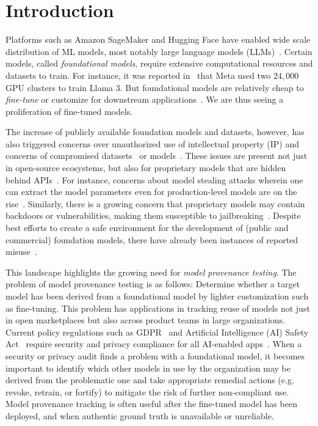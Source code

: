 \section{Introduction}
\label{sec:introduction}

%
Platforms such as Amazon SageMaker and Hugging Face have enabled wide scale distribution of ML models, most notably large language models (LLMs)~\cite{roziere2023code,wu2024pmc-huggingface,Intelligence2024}. 
%
Certain models, called {\em foundational models}, require extensive computational resources and datasets to train. For instance, it was reported in~\cite{meta-cluster} that Meta used two $24,000$ GPU clusters to train Llama 3. But foundational models are relatively cheap to {\em fine-tune} or customize for downstream applications~\cite{kenton2019bert,wu2021newsbert}. We are thus seeing a proliferation of fine-tuned models.

The increase of publicly available foundation models and datasets, however, has also triggered concerns over unauthorized use of intellectual property (IP) and concerns of compromised datasets~\cite{carlini2024poisoning} or models~\cite{hubinger2024sleeper}.
%
These issues are present not just in open-source ecosystems, but also for proprietary models that are hidden behind APIs~\cite{anil2023palm,chatgpt-api}. For instance, concerns about model stealing attacks wherein one can extract the model parameters even for production-level models are on the rise~\cite{carlini2024stealing,tramer2016stealing,orekondy2019knockoff}.
%
Similarly, there is a growing concern that proprietary models may contain backdoors or vulnerabilities, making them susceptible to jailbreaking~\cite{hubinger2024sleeper,anil2024many,zou2023universal}. 
Despite best efforts to create a safe environment for the development of (public and commercial) foundation models, there have already been instances of reported misuse~\cite{china2024llm,payload-malicious,childabuse-diffusion}.

This landscape highlights the growing need for {\em model provenance testing}. The problem of model provenance testing is as follows: 
Determine whether a target model has been derived from a foundational model by lighter customization such as fine-tuning.
%
This problem has applications in tracking reuse of models not just in open marketplaces but also across product teams in large organizations. Current policy regulations such as GDPR~\cite{GDPR2016a} and Artificial Intelligence (AI) Safety Act~\cite{council2024regulation} require security and privacy compliance for all AI-enabled apps~\cite{falco2021governing}. When a security or privacy audit finds a problem with a foundational model, it becomes important to identify which other models in use by the organization may be derived from the problematic one and take appropriate remedial actions (e.g. revoke, retrain, or fortify) to mitigate the risk of further non-compliant use. Model provenance tracking is often useful after the fine-tuned model has been deployed, and when authentic ground truth is unavailable or unreliable.





